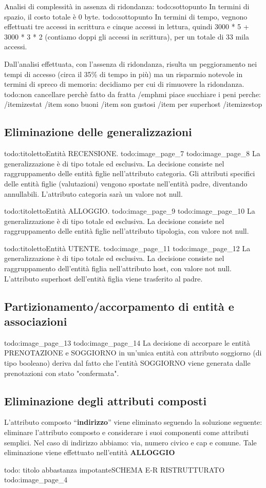 Analisi di complessità in assenza di ridondanza:
{todo:sottopunto} In termini di spazio, il costo totale è 0 byte.
{todo:sottopunto} In termini di tempo, vegnono effettuati tre accessi in scrittura e cinque accessi in lettura, quindi 3000 * 5 + 3000 * 3 * 2 (contiamo doppi gli accessi in scrittura), per un totale di 33 mila accessi.

Dall'analisi effettuata, con l'assenza di ridondanza, risulta un peggioramento nei tempi di accesso (circa il 35\% di tempo in più) ma un risparmio notevole in termini di spreco di memoria: decidiamo per cui di rimuovere la ridondanza.
{todo:non cancellare perchè fatto da fratta}
/emph{mi piace succhiare i peni perche:}
/itemize{stat}
/item sono buoni
/item son gustosi
/item per superhost
/itemize{stop}

\subsection{Eliminazione delle generalizzazioni}
{todo:titoletto}Entità RECENSIONE.
{todo:image_page_7}
{todo:image_page_8}
La generalizzazione è di tipo totale ed esclusiva. 
La decisione consiste nel raggruppamento delle entità	figlie nell'attributo categoria. Gli attributi specifici delle entità figlie (valutazioni) vengono spostate nell'entità padre, diventando annullabili. L'attributo categoria sarà un valore not null.

{todo:titoletto}Entità ALLOGGIO.
{todo:image_page_9}
{todo:image_page_10}
La generalizzazione è di tipo totale ed esclusiva. La decisione consiste nel raggruppamento delle entità	figlie nell'attributo tipologia, con valore not null.

{todo:titoletto}Entità UTENTE.
{todo:image_page_11}
{todo:image_page_12}
La generalizzazione è di tipo totale ed esclusiva. La decisione consiste nel raggruppamento dell'entità figlia nell'attributo host, con valore not null. L'attributo superhost dell'entità figlia viene trasferito al padre.

\subsection{Partizionamento/accorpamento di entità e associazioni}
{todo:image_page_13}
{todo:image_page_14}
La decisione di accorpare le entità PRENOTAZIONE e SOGGIORNO in un'unica entità con attributo soggiorno (di tipo booleano) deriva dal fatto che l'entità SOGGIORNO viene generata dalle prenotazioni con stato "confermata".

\subsection{Eliminazione degli attributi composti}
L’attributo composto “\textbf{indirizzo}” viene eliminato seguendo la soluzione seguente: eliminare l’attributo composto e considerare i suoi componenti come attributi semplici. Nel caso di indirizzo abbiamo: via, numero civico e cap e comune.
Tale eliminazione viene effettuato nell'entità \textbf{ALLOGGIO}

{todo: titolo abbastanza impotante}SCHEMA E-R RISTRUTTURATO
{todo:image_page_4}


